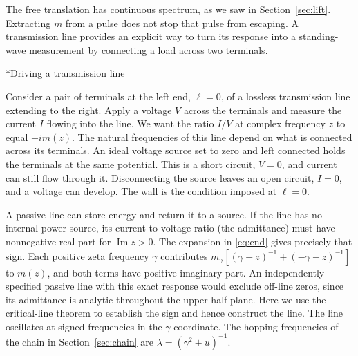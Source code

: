 \documentclass[11pt,letterpaper]{article}
\makeatletter
\renewcommand\subsection{\@startsection{subsection}{2}{\z@}{-2.0ex plus -.3ex}{.75ex}{\normalfont\normalsize\itshape}}
\numberwithin{equation}{section}
\makeatother
\begin{document}
The free translation has continuous spectrum, as we saw in Section~\ref{sec:lift}. Extracting $m$ from a pulse does not stop that pulse from escaping. A transmission line provides an explicit way to turn its response into a standing-wave measurement by connecting a load across two terminals.

\subsection*{Driving a transmission line}

Consider a pair of terminals at the left end, $\ell=0$, of a lossless transmission line extending to the right. Apply a voltage $V$ across the terminals and measure the current $I$ flowing into the line. We want the ratio $I/V$ at complex frequency $z$ to equal $-im(z)$. The natural frequencies of this line depend on what is connected across its terminals. An ideal voltage source set to zero and left connected holds the terminals at the same potential. This is a short circuit, $V=0$, and current can still flow through it. Disconnecting the source leaves an open circuit, $I=0$, and a voltage can develop. The wall is the condition imposed at $\ell=0$.

A passive line can store energy and return it to a source. If the line has no internal power source, its current-to-voltage ratio (the admittance) must have nonnegative real part for $\operatorname{Im}z>0$. The expansion in \eqref{eq:end} gives precisely that sign. Each positive zeta frequency $\gamma$ contributes $m_\gamma[(\gamma-z)^{-1}+(-\gamma-z)^{-1}]$ to $m(z)$, and both terms have positive imaginary part. An independently specified passive line with this exact response would exclude off-line zeros, since its admittance is analytic throughout the upper half-plane. Here we use the critical-line theorem to establish the sign and hence construct the line. The line oscillates at signed frequencies in the $\gamma$ coordinate. The hopping frequencies of the chain in Section~\ref{sec:chain} are $\lambda=(\gamma^2+u)^{-1}$.
\end{document}
